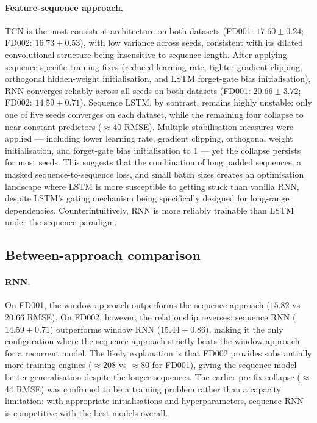 \documentclass[a4paper,11pt]{article}
\begin{document}
\paragraph{Feature-sequence approach.}
TCN is the most consistent architecture on both datasets (FD001: $17.60 \pm 0.24$; FD002: $16.73 \pm 0.53$), with low variance across seeds, consistent with its dilated convolutional structure being insensitive to sequence length.
After applying sequence-specific training fixes (reduced learning rate, tighter gradient clipping, orthogonal hidden-weight initialisation, and LSTM forget-gate bias initialisation), RNN converges reliably across all seeds on both datasets (FD001: $20.66 \pm 3.72$; FD002: $14.59 \pm 0.71$).
Sequence LSTM, by contrast, remains highly unstable: only one of five seeds converges on each dataset, while the remaining four collapse to near-constant predictors ($\approx$40 RMSE).
Multiple stabilisation measures were applied — including lower learning rate, gradient clipping, orthogonal weight initialisation, and forget-gate bias initialisation to 1 — yet the collapse persists for most seeds.
This suggests that the combination of long padded sequences, a masked sequence-to-sequence loss, and small batch sizes creates an optimisation landscape where LSTM is more susceptible to getting stuck than vanilla RNN, despite LSTM's gating mechanism being specifically designed for long-range dependencies.
Counterintuitively, RNN is more reliably trainable than LSTM under the sequence paradigm.

\subsection{Between-approach comparison}

\paragraph{RNN.}
On FD001, the window approach outperforms the sequence approach ($15.82$ vs $20.66$ RMSE).
On FD002, however, the relationship reverses: sequence RNN ($14.59 \pm 0.71$) outperforms window RNN ($15.44 \pm 0.86$), making it the only configuration where the sequence approach strictly beats the window approach for a recurrent model.
The likely explanation is that FD002 provides substantially more training engines ($\approx$208 vs $\approx$80 for FD001), giving the sequence model better generalisation despite the longer sequences.
The earlier pre-fix collapse ($\approx$44 RMSE) was confirmed to be a training problem rather than a capacity limitation: with appropriate initialisations and hyperparameters, sequence RNN is competitive with the best models overall.
\end{document}

